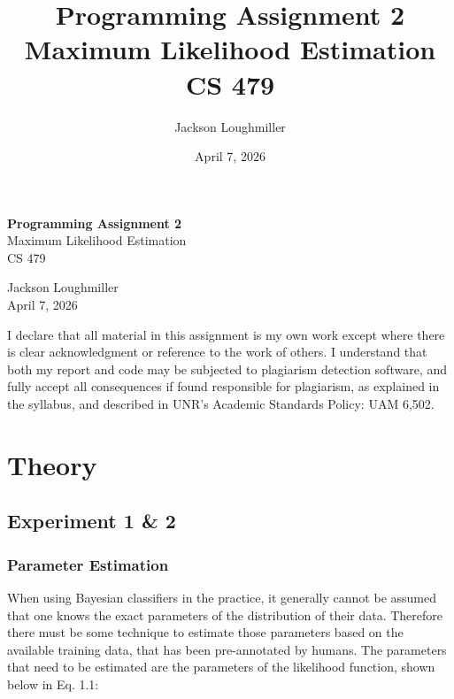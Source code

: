 \documentclass{article}
\title{Programming Assignment 2 \\ \large Maximum Likelihood Estimation \\ CS 479}
\author{Jackson Loughmiller}
\date{April 7, 2026}
\begin{document}
\begin{titlepage}
    \centering
    \vspace*{\fill}
    
    {\huge \textbf{Programming Assignment 2}} \\
    \vspace{0.5cm}
    {\Large Maximum Likelihood Estimation} \\
    \vspace{0.5cm}
    {\large CS 479}
    
    \vspace{2cm}
    
    {\large Jackson Loughmiller} \\
    \vspace{0.2cm}
    {\large April 7, 2026}
    
    \vspace{3cm}
    
    \noindent I declare that all material in this assignment is my own work except
    where there is clear acknowledgment or reference to the work of others.
    I understand that both my report and code may be subjected to plagiarism
    detection software, and fully accept all consequences if found
    responsible for plagiarism, as explained in the syllabus, and described
    in UNR's Academic Standards Policy: UAM 6,502.
    
    \vspace*{\fill}
\end{titlepage}

\newpage

\section{Theory}\label{theory}

\subsection{Experiment 1 \& 2}\label{experiment-1}

\subsubsection*{Parameter Estimation}\label{parameter-estimation}

When using Bayesian classifiers in the practice, it generally cannot be
assumed that one knows the exact parameters of the distribution of their
data. Therefore there must be some technique to estimate those
parameters based on the available training data, that has been
pre-annotated by humans. The parameters that need to be estimated are
the parameters of the likelihood function, shown below in Eq. 1.1:
\end{document}
